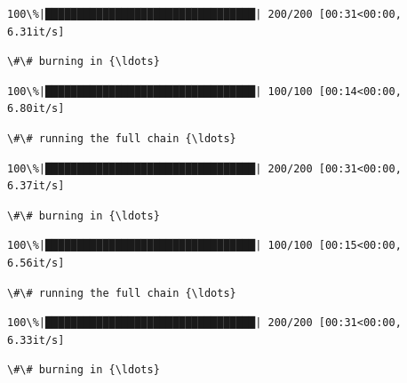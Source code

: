 \documentclass[11pt]{article}
\begin{document}
    \begin{Verbatim}[commandchars=\\\{\}]
100\%|█████████████████████████████████| 200/200 [00:31<00:00,  6.31it/s]
    \end{Verbatim}

    \begin{Verbatim}[commandchars=\\\{\}]
\#\# burning in {\ldots}
    \end{Verbatim}

    \begin{Verbatim}[commandchars=\\\{\}]
100\%|█████████████████████████████████| 100/100 [00:14<00:00,  6.80it/s]
    \end{Verbatim}

    \begin{Verbatim}[commandchars=\\\{\}]
\#\# running the full chain {\ldots}
    \end{Verbatim}

    \begin{Verbatim}[commandchars=\\\{\}]
100\%|█████████████████████████████████| 200/200 [00:31<00:00,  6.37it/s]
    \end{Verbatim}

    \begin{Verbatim}[commandchars=\\\{\}]
\#\# burning in {\ldots}
    \end{Verbatim}

    \begin{Verbatim}[commandchars=\\\{\}]
100\%|█████████████████████████████████| 100/100 [00:15<00:00,  6.56it/s]
    \end{Verbatim}

    \begin{Verbatim}[commandchars=\\\{\}]
\#\# running the full chain {\ldots}
    \end{Verbatim}

    \begin{Verbatim}[commandchars=\\\{\}]
100\%|█████████████████████████████████| 200/200 [00:31<00:00,  6.33it/s]
    \end{Verbatim}

    \begin{Verbatim}[commandchars=\\\{\}]
\#\# burning in {\ldots}
    \end{Verbatim}
\end{document}
